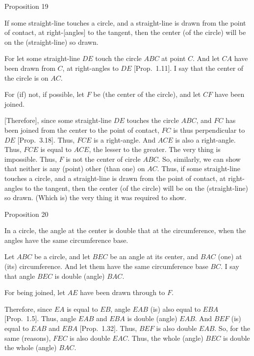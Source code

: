 
\begin{center}
{\large Proposition 19}
\end{center}

If some straight-line  touches a circle, and a straight-line is drawn from the
point of contact, at
right-[angles] to the tangent, then the center (of the circle) will be on the (straight-line) so drawn.

For let some straight-line $DE$  touch the circle $ABC$  at point $C$. And let $CA$
have been drawn from $C$, at right-angles to $DE$ [Prop.~1.11]. I say that the center of the circle is on $AC$.

\epsfysize=2.2in
\centerline{}

For (if) not, if possible, let $F$ be (the center of the circle), and let
$CF$ have been joined.

\mbox{[}Therefore], since some straight-line $DE$ touches the circle $ABC$, and
$FC$ has been joined from the center to the point of contact, $FC$ is thus
perpendicular to $DE$ [Prop.~3.18]. Thus, $FCE$ is a right-angle.
And $ACE$ is also a right-angle. Thus, $FCE$ is equal to $ACE$, the lesser to the
greater. The very thing is impossible. Thus, $F$ is not the center of circle $ABC$. 
So, similarly, we can show that neither is any (point) other (than one) on $AC$.\nline
Thus, if some straight-line touches a circle, and a straight-line is drawn from the
point of contact, at
right-angles to the tangent, then the center (of the circle) will be on the (straight-line) so drawn. (Which is) the very thing it was required to show.


\begin{center}
{\large Proposition 20}
\end{center}

In a circle, the angle at the center is double that at the circumference, when
the angles have the same circumference base.

Let $ABC$ be a circle, and let $BEC$ be an angle at its center, and $BAC$
(one) at (its) circumference. And let them have the same circumference base
$BC$. I say that angle $BEC$ is double (angle) $BAC$.

For being joined, let $AE$ have been drawn through to $F$.

Therefore, since $EA$ is equal to $EB$, angle $EAB$ (is) also equal to
$EBA$ [Prop.~1.5]. Thus, angle $EAB$ and $EBA$ is double (angle) $EAB$.
And $BEF$ (is) equal to $EAB$ and $EBA$ [Prop.~1.32]. Thus, $BEF$ is also
double $EAB$. So, for the same (reasons), $FEC$ is also double $EAC$. Thus,
the whole (angle) $BEC$ is double the whole (angle) $BAC$.

